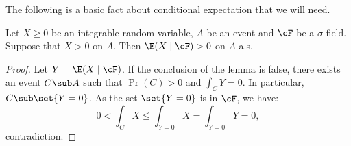 The following is a basic fact about conditional expectation that we will need.
\begin{lemma}
\label{l:strictly-positive}
Let $X \geq 0$ be an integrable random variable, $A$ be an event and $\cF$ be a $\sigma$-field. Suppose that $X > 0$ on $A$. Then $\E(X \mid \cF) > 0$ on $A$ a.s.
\end{lemma}
\begin{proof}
Let $Y = \E(X \mid \cF)$. If the conclusion of the lemma is false, there exists an event $C \sub A$ such that $\Pr(C) > 0$ and $\int_C Y = 0$. In particular, $C \sub \set{Y = 0}$. As the set $\set{Y = 0}$ is in $\cF$, we have:
\begin{equation*}
0 < \int_C X \leq \int_{Y = 0} X = \int_{Y = 0} Y = 0,
\end{equation*}
contradiction.
\end{proof}

